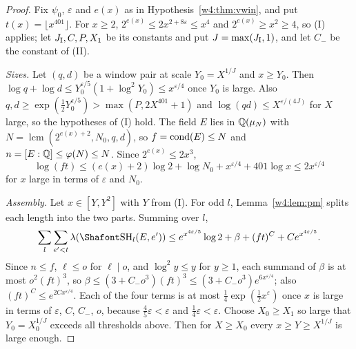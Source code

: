 \begin{proof}
Fix $\psi_0$, $\varepsilon$ and $e(x)$ as in Hypothesis~\ref{w4:thm:vwin}, and put $t(x)=\lfloor x^{401}\rfloor$. For $x\ge2$, $2^{e(x)}\le2x^{2+8\varepsilon}\le x^4$ and $2^{e(x)}\ge x^2\ge4$, so (I) applies; let $J_{\rm I},C,P,X_1$ be its constants and put $J=\max(J_{\rm I},1)$, and let $C_-$ be the constant of (II).

\emph{Sizes.} Let $(q,d)$ be a window pair at scale $Y_0=X^{1/J}$ and $x\ge Y_0$. Then $\log q+\log d\le Y_0^{\varepsilon/5}(1+\log^2Y_0)\le x^{\varepsilon/4}$ once $Y_0$ is large. Also $q,d\ge\exp(\frac12Y_0^{\varepsilon/5})>\max(P,2X^{401}+1)$ and $\log(qd)\le X^{\varepsilon/(4J)}$ for $X$ large, so the hypotheses of (I) hold. The field $E$ lies in $\mathbb Q(\mu_N)$ with $N=\operatorname{lcm}(2^{e(x)+2},N_0,q,d)$, so $f=\operatorname{cond}(E)\le N$ and $n=[E:\mathbb Q]\le\varphi(N)\le N$. Since $2^{e(x)}\le2x^{3}$,
\[
\log(ft)\le(e(x)+2)\log2+\log N_0+x^{\varepsilon/4}+401\log x\le2x^{\varepsilon/4}
\]
for $x$ large in terms of $\varepsilon$ and $N_0$.

\emph{Assembly.} Let $x\in[Y,Y^2]$ with $Y$ from (I). For odd $l$, Lemma~\ref{w4:lem:pm} splits each length into the two parts. Summing over $l$,
\[
\sum_l\sum_{e'<t}\lambda(\Sha_l(E,e'))\le e^{x^{4\varepsilon/5}}\log2+\beta+(ft)^C+Ce^{x^{4\varepsilon/5}}.
\]
Since $n\le f$, $\ell\le o$ for $\ell\mid o$, and $\log^2y\le y$ for $y\ge1$, each summand of $\beta$ is at most $o^2(ft)^3$, so $\beta\le(3+C_-o^3)(ft)^3\le(3+C_-o^3)e^{6x^{\varepsilon/4}}$; also $(ft)^C\le e^{2Cx^{\varepsilon/4}}$. Each of the four terms is at most $\frac14\exp(\frac12x^\varepsilon)$ once $x$ is large in terms of $\varepsilon$, $C$, $C_-$, $o$, because $\frac45\varepsilon<\varepsilon$ and $\frac14\varepsilon<\varepsilon$. Choose $X_0\ge X_1$ so large that $Y_0=X_0^{1/J}$ exceeds all thresholds above. Then for $X\ge X_0$ every $x\ge Y\ge X^{1/J}$ is large enough.
\end{proof}

